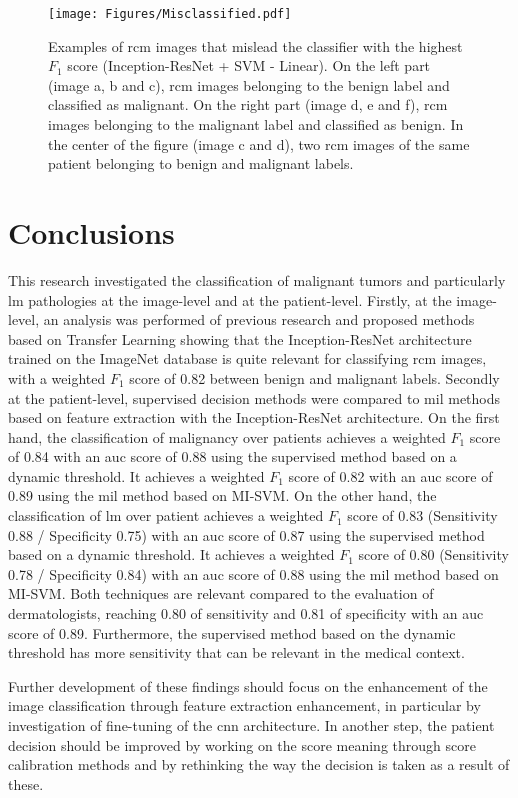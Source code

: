 \documentclass[journal,article,accept,moreauthors,pdftex, applsci]{Definitions/mdpi}
\newcommand{\fscore}{$F_{1}$ score}
\begin{document}
\begin{figure}[H]
    \centering
    \texttt{[image: Figures/Misclassified.pdf]}
    \caption{Examples of \ac{rcm} images that mislead the classifier with the highest \fscore{} (Inception-ResNet + SVM - Linear). On the left part (image a, b and c), \ac{rcm} images belonging to the benign label and classified as malignant. On the right part (image d, e and f), \ac{rcm} images belonging to the malignant label and classified as benign. In the center of the figure (image c and d), two \ac{rcm} images of the same patient belonging to benign and malignant labels.}
    \label{fig:misclassified}
\end{figure}
\section{Conclusions}
\label{sec:conclusions}
This research investigated the classification of malignant tumors and particularly \ac{lm} pathologies at the image-level and at the patient-level. Firstly, at the image-level, an analysis was performed of previous research and proposed methods based on Transfer Learning showing that the Inception-ResNet architecture trained on the ImageNet database is quite relevant for classifying \ac{rcm} images, with a weighted \fscore{} of 0.82 between benign and malignant labels. Secondly at the patient-level, supervised decision methods were compared to \ac{mil} methods based on feature extraction with the Inception-ResNet architecture. On the first hand, the classification of malignancy over patients achieves a weighted \fscore{} of 0.84 with an \ac{auc} score of 0.88 using the supervised method based on a dynamic threshold. It achieves a weighted \fscore{} of 0.82 with an \ac{auc} score of 0.89 using the \ac{mil} method based on MI-SVM. On the other hand, the classification of \ac{lm} over patient achieves a weighted \fscore{} of 0.83 (Sensitivity 0.88 / Specificity 0.75) with an \ac{auc} score of 0.87 using the supervised method based on a dynamic threshold. It achieves a weighted \fscore{} of 0.80 (Sensitivity 0.78 / Specificity 0.84) with an \ac{auc} score of 0.88 using the \ac{mil} method based on MI-SVM. Both techniques are relevant compared to the evaluation of dermatologists, reaching 0.80 of sensitivity and 0.81 of specificity with an \ac{auc} score of 0.89. Furthermore, the supervised method based on the dynamic threshold has more sensitivity that can be relevant in the medical context.\par
Further development of these findings should focus on the enhancement of the image classification through feature extraction enhancement, in particular by investigation of fine-tuning of the \ac{cnn} architecture. In another step, the patient decision should be improved by working on the score meaning through score calibration methods and by rethinking the way the decision is taken as a result of these.\par
\end{document}
